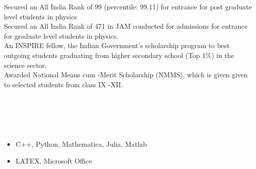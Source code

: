 \documentclass[14pt]{moderncv}
\begin{document}
\begin{minipage}{0.10\textwidth} 
\end{minipage}
\hspace{0.3cm}
\begin{minipage}{0.8\textwidth}
Secured an All India Rank of 99 (percentile: 99.11)  for entrance for post graduate level students in physics\\

Secured an All India Rank of 471 in JAM conducted
for admissions for entrance for graduate level students in physics.\\

An INSPIRE fellow, the Indian Government's scholarship program to best outgoing students graduating from higher
secondary school (Top 1\%) in the science sector.\\

Awarded National Means cum -Merit Scholarship (NMMS), which is given given to selected students from class IX -XII.

\end{minipage}\\\\











\\

\begin{minipage}{1\textwidth} 
\begin{itemize}
    \item C++, Python, Mathematica, Julia, Matlab
    \item LATEX, Microsoft Office
\end{itemize}\\


\end{minipage}\\
\end{document}
